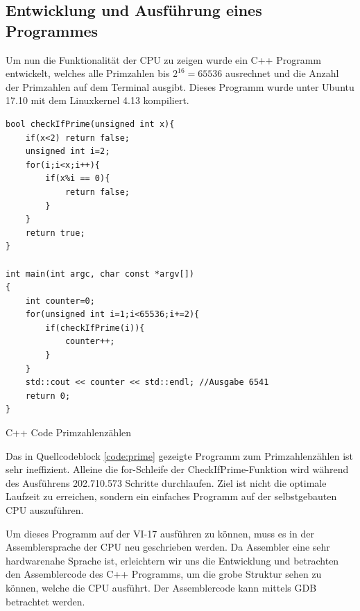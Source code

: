 \documentclass[a4paper,12pt]{article}
\begin{document}
\subsection{Entwicklung und Ausführung eines Programmes}
Um nun die Funktionalität der CPU zu zeigen wurde ein C++ Programm entwickelt, welches alle Primzahlen bis $2^{16} = 65536$ ausrechnet und die Anzahl der Primzahlen auf dem Terminal ausgibt. Dieses Programm wurde unter Ubuntu 17.10 mit dem Linuxkernel 4.13 kompiliert.

\begin{code}[!htb]
\begin{lstlisting}
bool checkIfPrime(unsigned int x){
	if(x<2) return false;
	unsigned int i=2;
	for(i;i<x;i++){
		if(x%i == 0){
			return false;
		}
	}
	return true;
}

int main(int argc, char const *argv[])
{
	int counter=0;
	for(unsigned int i=1;i<65536;i+=2){
		if(checkIfPrime(i)){
			counter++;
		}
	}
	std::cout << counter << std::endl; //Ausgabe 6541
	return 0;
}
\end{lstlisting}
\caption[C++ Code Primzahlenzählen]{C++ Code Primzahlenzählen}
\label{code:prime}
\end{code}

\noindent Das in Quellcodeblock \ref{code:prime} gezeigte Programm zum Primzahlenzählen ist sehr ineffizient. Alleine die for-Schleife der CheckIfPrime-Funktion wird während des Ausführens 202.710.573 Schritte durchlaufen. Ziel ist nicht die optimale Laufzeit zu erreichen, sondern ein einfaches Programm auf der selbstgebauten CPU auszuführen.

\par\bigskip\noindent Um dieses Programm auf der VI-17 ausführen zu können, muss es in der Assemblersprache der CPU neu geschrieben werden. Da Assembler eine sehr hardwarenahe Sprache ist, erleichtern wir uns die Entwicklung und betrachten den Assemblercode des C++ Programms, um die grobe Struktur sehen zu können, welche die CPU ausführt. Der Assemblercode kann mittels GDB betrachtet werden.
\newpage
\end{document}

